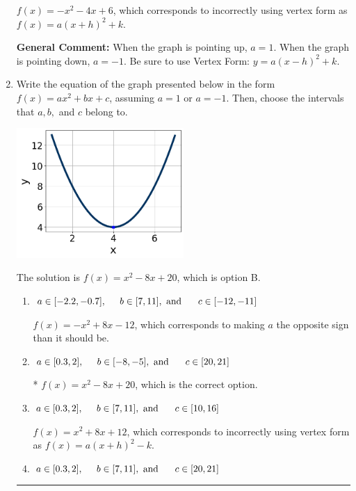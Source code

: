 \documentclass{extbook}[14pt]
\newcommand{\litem}[1]{\item #1

\rule{\textwidth}{0.4pt}}
\begin{document}
\begin{enumerate}
{\begin{enumerate}[label=\Alph*.]
$f(x)=-x^{2} -4 x + 6$, which corresponds to incorrectly using vertex form as $f(x) = a(x+h)^2+k$.
\end{enumerate}

\textbf{General Comment:} When the graph is pointing up, $a=1$. When the graph is pointing down, $a=-1$. Be sure to use Vertex Form: $y = a(x-h)^2+k$.
}
\litem{
Write the equation of the graph presented below in the form $f(x)=ax^2+bx+c$, assuming  $a=1$ or $a=-1$. Then, choose the intervals that $a, b,$ and $c$ belong to.

\begin{center}
    \includegraphics[width=0.5\textwidth]{../Figures/quadraticGraphToEquationB.png}
\end{center}



The solution is \( f(x) = x^{2} -8 x + 20 \), which is option B.\begin{enumerate}[label=\Alph*.]
\item \( a \in [-2.2, -0.7], \hspace*{5mm} b \in [7, 11], \text{ and } \hspace*{5mm} c \in [-12, -11] \)

$f(x)=-x^{2} +8 x -12$, which corresponds to making $a$ the opposite sign than it should be.
\item \( a \in [0.3, 2], \hspace*{5mm} b \in [-8, -5], \text{ and } \hspace*{5mm} c \in [20, 21] \)

* $f(x)=x^{2} -8 x + 20$, which is the correct option.
\item \( a \in [0.3, 2], \hspace*{5mm} b \in [7, 11], \text{ and } \hspace*{5mm} c \in [10, 16] \)

$f(x)=x^{2} +8 x + 12$, which corresponds to incorrectly using vertex form as $f(x) = a(x+h)^2 - k$.
\item \( a \in [0.3, 2], \hspace*{5mm} b \in [7, 11], \text{ and } \hspace*{5mm} c \in [20, 21] \)


\end{enumerate}}
\end{enumerate}
\end{document}
